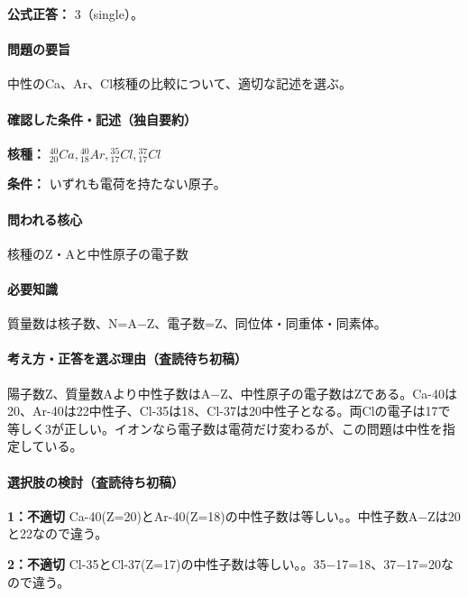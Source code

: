 \textbf{公式正答：} 3（single）。

\paragraph{問題の要旨} 中性のCa、Ar、Cl核種の比較について、適切な記述を選ぶ。

\paragraph{確認した条件・記述（独自要約）}\mbox{}\par

\noindent\textbf{核種：} \({}^{40}_{20}Ca,{}^{40}_{18}Ar,{}^{35}_{17}Cl,{}^{37}_{17}Cl\)\par

\noindent\textbf{条件：} いずれも電荷を持たない原子。\par

\paragraph{問われる核心} 核種のZ・Aと中性原子の電子数

\paragraph{必要知識} 質量数は核子数、N=\allowbreak{}A−Z、電子数=Z、同位体・同重体・同素体。

\paragraph{考え方・正答を選ぶ理由（査読待ち初稿）} 陽子数Z、質量数Aより中性子数はA−Z、中性原子の電子数はZである。Ca-40は20、Ar-40は22中性子、Cl-35は18、Cl-37は20中性子となる。両Clの電子は17で等しく3が正しい。イオンなら電子数は電荷だけ変わるが、この問題は中性を指定している。

\paragraph{選択肢の検討（査読待ち初稿）}\mbox{}\par

\noindent\textbf{1：不適切} Ca-40(Z=\allowbreak{}20)とAr-40(Z=\allowbreak{}18)の中性子数は等しい。。中性子数A−Zは20と22なので違う。\par

\noindent\textbf{2：不適切} Cl-35とCl-37(Z=\allowbreak{}17)の中性子数は等しい。。35−17=\allowbreak{}18、37−17=\allowbreak{}20なので違う。\par

